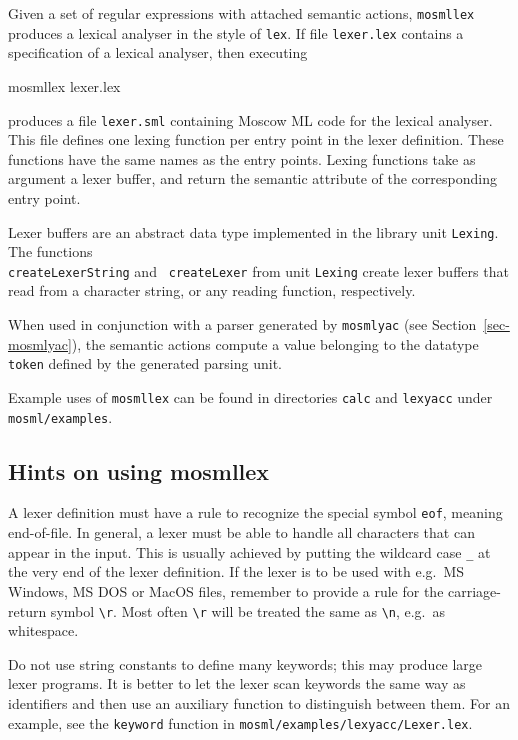 \documentclass[fleqn,a4paper]{article}
\begin{document}
Given a set of regular expressions with attached semantic actions,
{\tt mosmllex} produces a lexical analyser in the style of {\tt lex}.
If file {\tt lexer.lex} contains a specification of a lexical
analyser, then executing

\begin{program}
mosmllex lexer.lex  
\end{program}

\noindent produces a file {\tt lexer.sml} containing Moscow ML code
for the lexical analyser.  This file defines one lexing function per
entry point in the lexer definition.  These functions have the same
names as the entry points.  Lexing functions take as argument a lexer
buffer, and return the semantic attribute of the corresponding entry
point.

Lexer buffers are an abstract data type implemented in the library
unit {\tt Lexing}.  The functions\\ {\tt createLexerString} and {\tt
  createLexer} from unit {\tt Lexing} create lexer buffers that read
from a character string, or any reading function, respectively.

When used in conjunction with a parser generated by {\tt mosmlyac}
(see Section~\ref{sec-mosmlyac}), the semantic actions compute a value
belonging to the datatype {\tt token} defined by the generated parsing
unit.

Example uses of {\tt mosmllex} can be found in directories {\tt calc}
and {\tt lexyacc} under {\tt mosml/examples}.


\subsection{Hints on using mosmllex}

A lexer definition must have a rule to recognize the special symbol
{\tt eof}, meaning end-of-file.  In general, a lexer must be able to
handle all characters that can appear in the input.  This is usually
achieved by putting the wildcard case \verb#_# at the very end of the
lexer definition.  If the lexer is to be used with e.g.\ MS Windows,
MS DOS or MacOS files, remember to provide a rule for the
carriage-return symbol \verb#\r#.  Most often \verb#\r# will be
treated the same as \verb#\n#, e.g.\ as whitespace.

Do not use string constants to define many keywords; this may produce
large lexer programs.  It is better to let the lexer scan keywords the
same way as identifiers and then use an auxiliary function to
distinguish between them.  For an example, see the {\tt keyword}
function in {\tt mosml/examples/lexyacc/Lexer.lex}.
\end{document}
